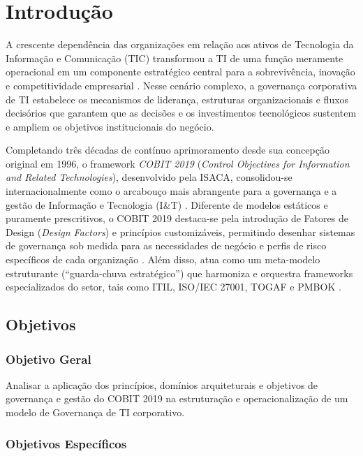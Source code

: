 \section{Introdução}

A crescente dependência das organizações em relação aos ativos de Tecnologia da Informação e Comunicação (TIC) transformou a TI de uma função meramente operacional em um componente estratégico central para a sobrevivência, inovação e competitividade empresarial \cite{weill2004governance,fernandes2014implantando}. Nesse cenário complexo, a governança corporativa de TI estabelece os mecanismos de liderança, estruturas organizacionais e fluxos decisórios que garantem que as decisões e os investimentos tecnológicos sustentem e ampliem os objetivos institucionais do negócio.

Completando três décadas de contínuo aprimoramento desde sua concepção original em 1996, o framework \textit{COBIT 2019} (\textit{Control Objectives for Information and Related Technologies}), desenvolvido pela ISACA, consolidou-se internacionalmente como o arcabouço mais abrangente para a governança e a gestão de Informação e Tecnologia (I\&T) \cite{isaca2019framework}. Diferente de modelos estáticos e puramente prescritivos, o COBIT 2019 destaca-se pela introdução de Fatores de Design (\textit{Design Factors}) e princípios customizáveis, permitindo desenhar sistemas de governança sob medida para as necessidades de negócio e perfis de risco específicos de cada organização \cite{isaca2019design}. Além disso, atua como um meta-modelo estruturante (``guarda-chuva estratégico'') que harmoniza e orquestra frameworks especializados do setor, tais como ITIL, ISO/IEC 27001, TOGAF e PMBOK \cite{feely2007getting,iso2024iso38500}.

\subsection{Objetivos}

\subsubsection{Objetivo Geral}

Analisar a aplicação dos princípios, domínios arquiteturais e objetivos de governança e gestão do COBIT 2019 na estruturação e operacionalização de um modelo de Governança de TI corporativo.

\subsubsection{Objetivos Específicos}

